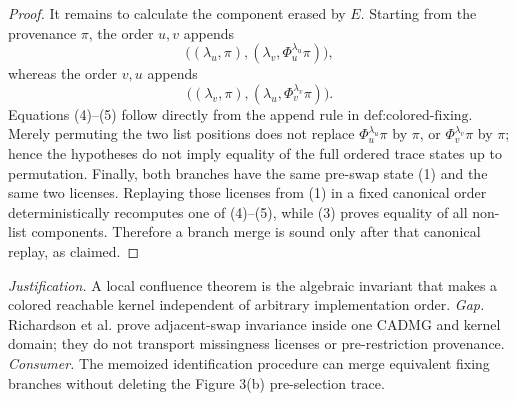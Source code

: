 \documentclass{article}
\begin{document}
\begin{proof}
It remains to calculate the component erased by \(E\).  Starting from the provenance \(\pi\), the order \(u,v\) appends
\[
\bigl((\lambda_u,\pi),(\lambda_v,\Phi_u^{\lambda_u}\pi)\bigr),
\tag{4}
\]
whereas the order \(v,u\) appends
\[
\bigl((\lambda_v,\pi),(\lambda_u,\Phi_v^{\lambda_v}\pi)\bigr).
\tag{5}
\]
Equations (4)--(5) follow directly from the append rule in \(\text{def:colored-fixing}\).  Merely permuting the two list positions does not replace \(\Phi_u^{\lambda_u}\pi\) by \(\pi\), or \(\Phi_v^{\lambda_v}\pi\) by \(\pi\); hence the hypotheses do not imply equality of the full ordered trace states up to permutation.  Finally, both branches have the same pre-swap state (1) and the same two licenses.  Replaying those licenses from (1) in a fixed canonical order deterministically recomputes one of (4)--(5), while (3) proves equality of all non-list components.  Therefore a branch merge is sound only after that canonical replay, as claimed.
\end{proof}
\par\smallskip\noindent \textit{Justification.} A local confluence theorem is the algebraic invariant that makes a colored reachable kernel independent of arbitrary implementation order. \textit{Gap.} Richardson et al. prove adjacent-swap invariance inside one CADMG and kernel domain; they do not transport missingness licenses or pre-restriction provenance. \textit{Consumer.} The memoized identification procedure can merge equivalent fixing branches without deleting the Figure 3(b) pre-selection trace.
\end{document}
